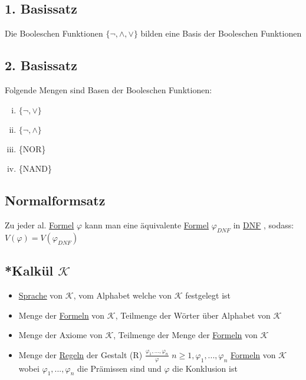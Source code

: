 \documentclass[12pt,a4paper]{article} %
\begin{document}
	\subsection{1. Basissatz}
	Die Booleschen Funktionen $\{\neg, \land, \lor\}$ bilden eine Basis der Booleschen Funktionen
	
	\subsection{2. Basissatz}
	Folgende Mengen sind Basen der Booleschen Funktionen: \newline
	\begin{enumerate}[(i)]
		\item $\{\neg, \lor\}$
		\item $\{\neg, \land\}$
		\item \{NOR\}
		\item \{NAND\}
	\end{enumerate}
	
	\subsection{Normalformsatz}
	Zu jeder al. \hyperref[Formel]{Formel} $\varphi$ kann man eine äquivalente \hyperref[Formel]{Formel} $\varphi_{DNF}$ in \hyperref[DNF]{DNF} , sodass: $V(\varphi) = V(\varphi_{DNF})$
	
	\subsection{*Kalkül $\mathcal{K}$}
	\label{Kalkul}
	\begin{itemize}
		\item \hyperref[Sprache]{Sprache} von $\mathcal{K}$, vom Alphabet welche von $\mathcal{K}$ festgelegt ist
		\item Menge der \hyperref[Formel]{Formeln} von $\mathcal{K}$, Teilmenge der Wörter über Alphabet von $\mathcal{K}$
		\item Menge der Axiome von $\mathcal{K}$, Teilmenge der Menge der \hyperref[Formel]{Formeln} von $\mathcal{K}$
		\item Menge der \hyperref[Kalkul]{Regeln} der Gestalt \newline
		(R) $\frac{\varphi_1, ..., \varphi_n}{\varphi}$ \space \space $n \ge 1, \varphi_1, ..., \varphi_n$ \hyperref[Formel]{Formeln} von $\mathcal{K}$ wobei $\varphi_1, ..., \varphi_n$ die Prämissen sind und $\varphi$ die Konklusion ist
	\end{itemize}
\end{document}
